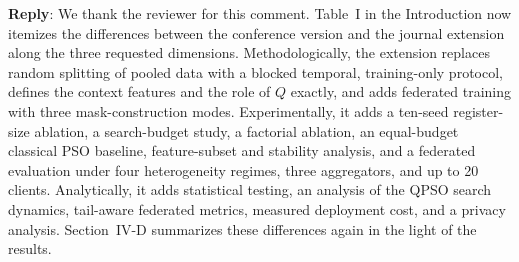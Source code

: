 \documentclass[11pt]{article}
\newcommand{\reply}{\noindent\textbf{Reply}: }
\begin{document}
\reply We thank the reviewer for this comment. Table~I in the Introduction
now itemizes the differences between the conference version and the journal
extension along the three requested dimensions. Methodologically, the
extension replaces random splitting of pooled data with a blocked temporal,
training-only protocol, defines the context features and the role of $Q$
exactly, and adds federated training with three mask-construction modes.
Experimentally, it adds a ten-seed register-size ablation, a search-budget
study, a factorial ablation, an equal-budget classical PSO baseline,
feature-subset and stability analysis, and a federated evaluation under four
heterogeneity regimes, three aggregators, and up to 20 clients. Analytically,
it adds statistical testing, an analysis of the QPSO search dynamics,
tail-aware federated metrics, measured deployment cost, and a privacy
analysis. Section~IV-D summarizes these differences again in the light of the
results.
\end{document}
